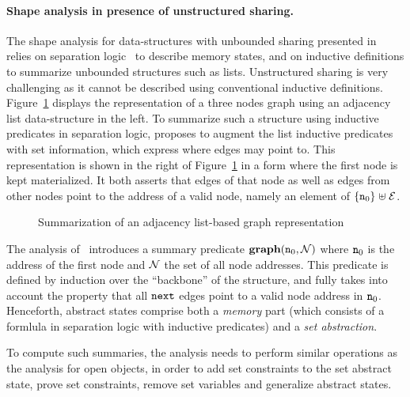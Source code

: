 \paragraph{Shape analysis in presence of unstructured sharing.}
The shape analysis for data-structures with unbounded sharing presented
in~\cite{memcad:15:sas} relies on separation logic~\cite{r:lics:02} to
describe memory states, and on inductive definitions to summarize
unbounded structures such as lists.
Unstructured sharing is very challenging as it cannot be described using
conventional inductive definitions.
Figure~\ref{f:3:memcad} displays the representation of a three nodes
graph using an adjacency list data-structure in the left.
To summarize such a structure using inductive predicates in separation
logic, \cite{memcad:15:sas} proposes to augment the list inductive
predicates with set information, which express where edges may point to.
This representation is shown in the right of Figure~\ref{f:3:memcad} in
a form where the first node is kept materialized.
It both asserts that edges of that node as well as edges from other nodes
point to the address of a valid node, namely an element of \( \{ \texttt{n}_{0}
\} \mathrel{\uplus} \mathcal{E} \).
\begin{figure}[t]
  \newcommand{\picscale}{0.9}
  \tikzpics{\picscale}{memcad-inv}
  \caption{Summarization of an adjacency list-based graph representation}
  \label{f:3:memcad}
\end{figure}
The analysis of~\cite{memcad:15:sas} introduces a summary predicate
\( \textbf{graph}( \texttt{n}_{0}, \mathcal{N} ) \) where \( \texttt{n}_{0} \) is the
address of the first node and \( \mathcal{N} \) the set of all node addresses.
This predicate is defined by induction over the ``backbone'' of the
structure, and fully takes into account the property that all
\( \mathtt{next} \) edges point to a valid node address in \( \texttt{n}_{0} \).
Henceforth, abstract states comprise both a {\em memory} part (which
consists of a formlula in separation logic with inductive predicates)
and a {\em set abstraction}.

To compute such summaries, the analysis needs to perform similar
operations as the analysis for open objects, in order to add set
constraints to the set abstract state, prove set constraints,
remove set variables and generalize abstract states.

